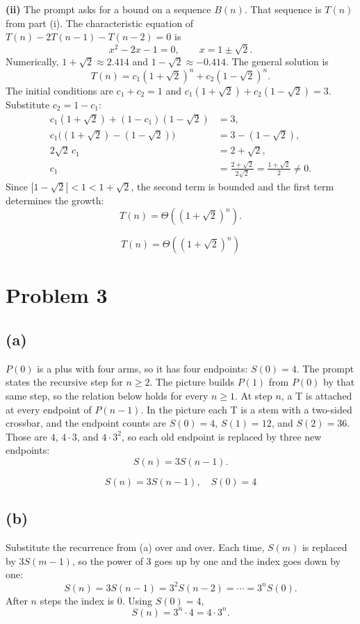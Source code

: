 \documentclass[11pt]{article}
\begin{document}
\textbf{(ii)}
The prompt asks for a bound on a sequence $B(n)$. That sequence is $T(n)$ from part (i). The characteristic equation of $T(n)-2T(n-1)-T(n-2)=0$ is
\[
x^{2}-2x-1=0, \qquad x=1\pm\sqrt{2}.
\]
Numerically, $1+\sqrt{2}\approx 2.414$ and $1-\sqrt{2}\approx -0.414$. The general solution is
\[
T(n)=c_{1}(1+\sqrt{2})^{n}+c_{2}(1-\sqrt{2})^{n}.
\]
The initial conditions are $c_{1}+c_{2}=1$ and $c_{1}(1+\sqrt{2})+c_{2}(1-\sqrt{2})=3$. Substitute $c_{2}=1-c_{1}$:
\begin{align*}
c_{1}(1+\sqrt{2})+(1-c_{1})(1-\sqrt{2})&=3,\\
c_{1}\bigl((1+\sqrt{2})-(1-\sqrt{2})\bigr)&=3-(1-\sqrt{2}),\\
2\sqrt{2}\,c_{1}&=2+\sqrt{2},\\
c_{1}&=\frac{2+\sqrt{2}}{2\sqrt{2}}=\frac{1+\sqrt{2}}{2}\neq 0.
\end{align*}
Since $|1-\sqrt{2}|<1<1+\sqrt{2}$, the second term is bounded and the first term determines the growth:
\[
T(n)=\Theta\!\left((1+\sqrt{2})^{n}\right).
\]

\[
\boxed{T(n)=\Theta\!\left((1+\sqrt{2})^{n}\right)}
\]

\section*{Problem 3}

\subsection*{(a)}

$P(0)$ is a plus with four arms, so it has four endpoints: $S(0)=4$. The prompt states the recursive step for $n\ge 2$. The picture builds $P(1)$ from $P(0)$ by that same step, so the relation below holds for every $n\ge 1$. At step $n$, a T is attached at every endpoint of $P(n-1)$. In the picture each T is a stem with a two-sided crossbar, and the endpoint counts are $S(0)=4$, $S(1)=12$, and $S(2)=36$. Those are $4$, $4\cdot 3$, and $4\cdot 3^{2}$, so each old endpoint is replaced by three new endpoints:
\[
S(n)=3S(n-1).
\]

\[
\boxed{S(n)=3S(n-1),\quad S(0)=4}
\]

\subsection*{(b)}

Substitute the recurrence from (a) over and over. Each time, $S(m)$ is replaced by $3S(m-1)$, so the power of $3$ goes up by one and the index goes down by one:
\[
S(n)=3S(n-1)=3^{2}S(n-2)=\cdots=3^{n}S(0).
\]
After $n$ steps the index is $0$. Using $S(0)=4$,
\[
S(n)=3^{n}\cdot 4=4\cdot 3^{n}.
\]
\end{document}

